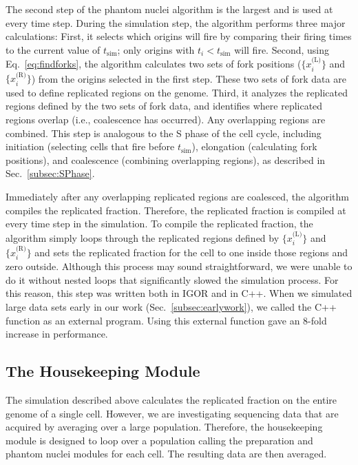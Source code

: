 		The second step of the phantom nuclei algorithm is the largest and is used at every time step.
		During the simulation step, the algorithm performs three major calculations:
		First, it selects which origins will fire by comparing their firing times to the current value of $t_\text{sim}$; only origins with $t_i < t_\text{sim}$ will fire.
		Second, using Eq.~\ref{eq:findforks}, the algorithm calculates two sets of fork positions ($\{x_i^\text{(L)}\}$ and $\{x_i^\text{(R)}\}$) from the origins selected in the first step.
		These two sets of fork data are used to define replicated regions on the genome.
		Third, it analyzes the replicated regions defined by the two sets of fork data, and identifies where replicated regions overlap (i.e., coalescence has occurred).
		Any overlapping regions are combined.
		This step is analogous to the S phase of the cell cycle, including initiation (selecting cells that fire before $t_\text{sim}$), elongation (calculating fork positions), and coalescence (combining overlapping regions), as described in Sec.~\ref{subsec:SPhase}.
		
		Immediately after any overlapping replicated regions are coalesced, the algorithm compiles the replicated fraction.
		Therefore, the replicated fraction is compiled at every time step in the simulation.
		To compile the replicated fraction, the algorithm simply loops through the replicated regions defined by $\{x_i^\text{(L)}\}$ and $\{x_i^\text{(R)}\}$ and sets the replicated fraction for the cell to one inside those regions and zero outside.
		Although this process may sound straightforward, we were unable to do it without nested loops that significantly slowed the simulation process.
		For this reason, this step was written both in IGOR and in C++.
		When we simulated large data sets early in our work (Sec.~\ref{subsec:earlywork}), we called the C++ function as an external program.
		Using this external function gave an 8-fold increase in performance.
		
		
		\subsection{The Housekeeping Module}
		\label{subsec:Housing}
		
		The simulation described above calculates the replicated fraction on the entire genome of a single cell.
		However, we are investigating sequencing data that are acquired by averaging over a large population.
		Therefore, the housekeeping module is designed to loop over a population calling the preparation and phantom nuclei modules for each cell.
		The resulting data are then averaged.
		
